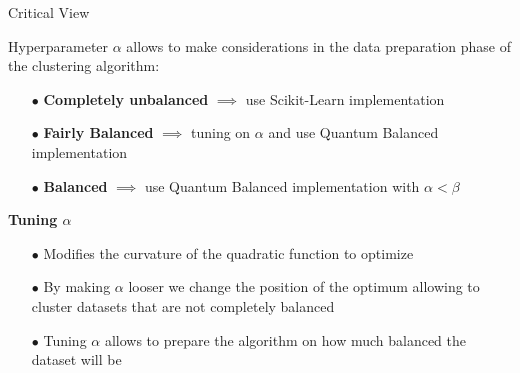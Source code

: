 \begin{frame}[allowframebreaks]{Critical View}
		\framebreak
		\small{
		Hyperparameter $\alpha$ allows to make considerations in the data preparation phase of the clustering algorithm:
		\begin{itemize}
			\item[$\bullet$] \textbf{Completely unbalanced} $\implies$ use Scikit-Learn implementation
			\item[$\bullet$] \textbf{Fairly Balanced} $\implies$ tuning on $\alpha$ and use Quantum Balanced implementation
			\item[$\bullet$] \textbf{Balanced} $\implies$ use Quantum Balanced implementation with $\alpha < \beta$
		\end{itemize}
		\textbf{Tuning $\alpha$}
		\begin{itemize}
			\item[$\bullet$] Modifies the curvature of the quadratic function to optimize
			\item[$\bullet$] By making $\alpha$ looser we change the position of the optimum allowing to cluster datasets that are not completely balanced
			\item[$\bullet$] Tuning $\alpha$ allows to prepare the algorithm on how much balanced the dataset will be 
		\end{itemize}
		}
	

\end{frame}
